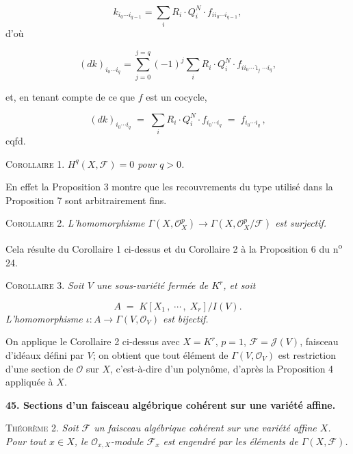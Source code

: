 \begin{equation*}
k_{i_0 \cdots i_{q-1}} = \sum_i R_i \cdot Q_i^N \cdot f_{i i_0 \cdots i_{q-1}} ,
\end{equation*}
d'où

\begin{equation*}
(dk)_{i_0 \cdots i_q} = \sum_{j=0}^{j=q} (-1)^j \sum_i R_i \cdot Q_i^N \cdot f_{i i_0 \cdots \hat{\imath}_j \cdots i_q} ,
\end{equation*}


 et, en tenant compte de ce que $f$ est un cocycle,

\begin{equation*}
(dk)_{i_0\cdots i_q} \;=\; \sum_i R_i \cdot Q_i^N \cdot f_{i_0\cdots i_q} \;=\; f_{i_0\cdots i_q} \, ,
\end{equation*}
\hfill cqfd.

\textsc{Corollaire} 1. \textit{$H^q(X, \mathcal{F}) = 0$ pour $q > 0$.}

En effet la Proposition 3 montre que les recouvrements du type utilisé dans la Proposition 7 sont arbitrairement fins.

\textsc{Corollaire} 2. \textit{L'homomorphisme $\Gamma(X, \mathcal{O}_X^p) \to \Gamma(X, \mathcal{O}_X^p/\mathcal{F})$ est surjectif.}

Cela résulte du Corollaire 1 ci-dessus et du Corollaire 2 à la Proposition 6 du n\textsuperscript{o} 24.

\textsc{Corollaire} 3. \textit{Soit $V$ une sous-variété fermée de $K^r$, et soit}

\begin{equation*}
A \;=\; K[X_1 \, , \; \cdots \, , \; X_r]/I(V).
\end{equation*}
\textit{L'homomorphisme $\iota : A \to \Gamma(V, \mathcal{O}_V)$ est bijectif.}

On applique le Corollaire 2 ci-dessus avec $X = K^r$, $p = 1$, $\mathcal{F} = \mathcal{J}(V)$, faisceau d'idéaux défini par $V$; on obtient que tout élément de $\Gamma(V, \mathcal{O}_V)$ est restriction d'une section de $\mathcal{O}$ sur $X$, c'est-à-dire d'un polynôme, d'après la Proposition 4 appliquée à $X$.


\textbf{45. Sections d'un faisceau algébrique cohérent sur une variété affine.}

\textsc{Théorème} 2. \textit{Soit $\mathcal{F}$ un faisceau algébrique cohérent sur une variété affine $X$. Pour tout $x \in X$, le $\mathcal{O}_{x,X}$-module $\mathcal{F}_x$ est engendré par les éléments de $\Gamma(X, \mathcal{F})$.}

